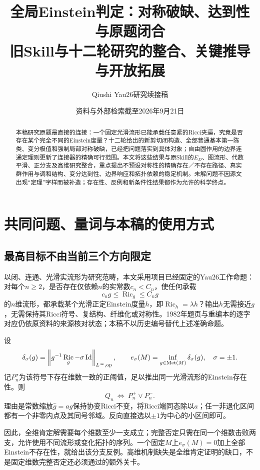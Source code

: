 \documentclass[UTF8,fontset=fandol,zihao=-4]{ctexart}
\title{全局Einstein判定：对称破缺、达到性与原题闭合\\[3mm]\large 旧Skill与十二轮研究的整合、关键推导与开放拓展}
\author{Qiushi Yau26研究续接稿}
\date{资料与外部检索截至2026年9月21日}
\DeclareMathOperator{\Ric}{Ric}\DeclareMathOperator{\Rm}{Rm}
\DeclareMathOperator{\Id}{Id}\DeclareMathOperator{\Hess}{Hess}
\newcommand{\norm}[1]{\left\|#1\right\|}
\theoremstyle{cn}
\begin{document}
\maketitle
\begin{abstract}

本稿研究原题最直接的连接：一个固定光滑流形已能承载任意紧的Ricci夹逼，究竟是否存在某个完全不同的Einstein度量？十二轮给出的新剪切闭构造、全部普通基本第一陈类、变分极值和强制局部对称破缺，已经把问题落实到具体对象；自由圆作用的边界连通定理则更新了连接器的精确可行范围。本文将这些结果与原Skill的$E_D$、图流形、代数平滑、正分支及高维研究整合，重点提出不预设对称性的精确存在／不存在路径、真实群作用与调和结构、变分达到性、边界响应和拓扑依赖的稳定机制。未解问题不因源文出现“定理”字样而被补造；存在性、反例和新条件性结果都作为允许的科学终点。

\end{abstract}\begingroup\small\setlength{\parskip}{0pt}\tableofcontents\endgroup\newpage

\section{共同问题、量词与本稿的使用方式}
\subsection{最高目标不由当前三个方向限定}
以闭、连通、光滑实流形为研究范畴，本文采用项目已经固定的Yau26工作命题：对每个$n\ge2$，是否存在仅依赖$n$的实常数$c_n<C_n$，使任何承载
\[
 c_ng\le\Ric_g\le C_ng
\]
的$n$维流形，都承载某个光滑正定Einstein度量$h$，即$\Ric_h=\lambda h$？输出$h$无需接近$g$，无需保持其Ricci符号、复结构、纤维化或对称性。1982年题页与重编本的逐字对应仍依原资料的来源核对状态；本稿不以历史编号替代上述准确命题。

设
\[
 \delta_\sigma(g)=\norm{g^{-1}\Ric_g-\sigma\Id}_{L^\infty,\op},\qquad
 e_\sigma(M)=\inf_{g\in\Met(M)}\delta_\sigma(g),\quad\sigma=\pm1.
\]
记$P_n^\sigma$为该符号下存在维数一致的正阈值，足以推出同一光滑流形的Einstein存在性。则
\begin{equation}\label{eq:Q}
 Q_n\ \Longleftrightarrow\ P_n^+\lor P_n^-.
\end{equation}
理由是常数缩放$\widehat g=ag$保持协变Ricci不变，将Ricci端同态除以$a$；任一非退化区间都有一个非零内点及其同号邻域。反向直接选以$\pm1$为中心的小区间即可。

因此，全维肯定解需要每个维数至少一支成立；完整否定只需在同一个维数击败两支，允许使用不同流形或变化拓扑的序列。一个固定$M$上$e_\sigma(M)=0$加上全部Einstein不存在性，就给出该分支反例。高维机制缺失是全维肯定证明的缺口，不是固定维数完整否定还必须通过的额外关卡。
\end{document}
